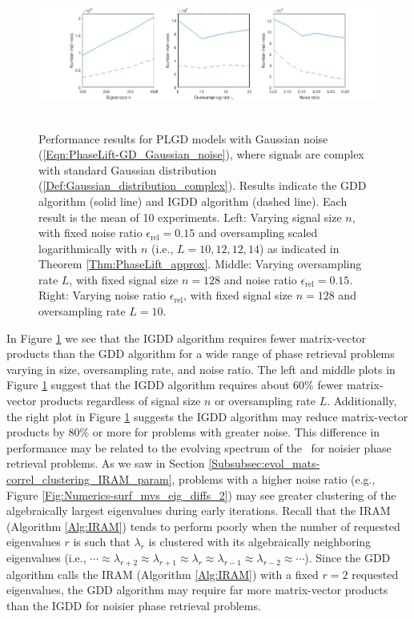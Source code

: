 \begin{figure}[H]
\centering
\hbox{\hspace{-1.1cm} 
	\includegraphics[scale=0.6]{Numerics-ada_vs_orig_various_params}
			}
	\vspace{0.0cm}
	\caption{
	Performance results for PLGD models with Gaussian noise (\ref{Eqn:PhaseLift-GD_Gaussian_noise}), where signals are complex with standard Gaussian distribution (\ref{Def:Gaussian_distribution_complex}).
	Results indicate the GDD algorithm (solid line) and IGDD algorithm (dashed line). 
	Each result is the mean of 10 experiments.
	Left: Varying signal size $n$, with fixed noise ratio $\epsilon_\text{rel} = 0.15$ and oversampling scaled logarithmically with $n$ (i.e., $L = 10, 12, 12, 14$) as indicated in Theorem \ref{Thm:PhaseLift_approx}.
	Middle: Varying oversampling rate $L$, with fixed signal size $n = 128$ and noise ratio $\epsilon_\text{rel} = 0.15$.
	Right: Varying noise ratio $\epsilon_\text{rel}$, with fixed signal size $n = 128$ and oversampling rate $L = 10$.
	}
\label{Fig:Numerics-ada_vs_orig_various_params}
\end{figure}

In Figure \ref{Fig:Numerics-ada_vs_orig_various_params} we see that the IGDD algorithm requires fewer matrix-vector products than the GDD algorithm for a wide range of phase retrieval problems varying in size, oversampling rate, and noise ratio.
The left and middle plots in Figure \ref{Fig:Numerics-ada_vs_orig_various_params} suggest that the IGDD algorithm requires about $60\%$ fewer matrix-vector products regardless of signal size $n$ or oversampling rate $L$.
Additionally, the right plot in Figure \ref{Fig:Numerics-ada_vs_orig_various_params} suggests the IGDD algorithm may reduce matrix-vector products by $80\%$ or more for problems with greater noise.
This difference in performance may be related to the evolving spectrum of the \emep \ for noisier phase retrieval problems.
As we saw in Section \ref{Subsubsec:evol_mats-correl_clustering_IRAM_param}, problems with a higher noise ratio (e.g., Figure \ref{Fig:Numerics-surf_mvs_eig_diffs_2}) may see greater clustering of the algebraically largest eigenvalues during early iterations.
Recall that the IRAM (Algorithm \ref{Alg:IRAM}) tends to perform poorly when the number of requested eigenvalues $r$ is such that $\lambda_r$ is clustered with its algebraically neighboring eigenvalues (i.e., $\cdots \approx \lambda_{r+2} \approx \lambda_{r+1} \approx \lambda_r \approx \lambda_{r-1} \approx \lambda_{r-2} \approx \cdots$). 
Since the GDD algorithm calls the IRAM (Algorithm \ref{Alg:IRAM}) with a fixed $r=2$ requested eigenvalues, the GDD algorithm may require far more matrix-vector products than the IGDD for noisier phase retrieval problems.



